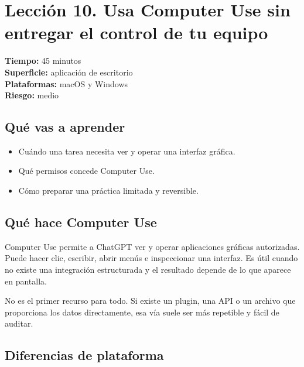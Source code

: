 \documentclass[10pt,a4paper,openany]{book}
\providecommand{\tightlist}{\setlength{\itemsep}{0.18em}\setlength{\parskip}{0pt}}
\begin{document}
\clearpage

\section{Lección 10. Usa Computer Use sin entregar el control de tu
equipo}\label{lecciuxf3n-10.-usa-computer-use-sin-entregar-el-control-de-tu-equipo}

\begin{metabox}

\textbf{Tiempo:} 45 minutos\\
\textbf{Superficie:} aplicación de escritorio\\
\textbf{Plataformas:} macOS y Windows\\
\textbf{Riesgo:} medio

\end{metabox}

\subsection{Qué vas a aprender}\label{quuxe9-vas-a-aprender-9}

\begin{itemize}
\tightlist
\item
  Cuándo una tarea necesita ver y operar una interfaz gráfica.
\item
  Qué permisos concede Computer Use.
\item
  Cómo preparar una práctica limitada y reversible.
\end{itemize}

\subsection{Qué hace Computer Use}\label{quuxe9-hace-computer-use}

Computer Use permite a ChatGPT ver y operar aplicaciones gráficas
autorizadas. Puede hacer clic, escribir, abrir menús e inspeccionar una
interfaz. Es útil cuando no existe una integración estructurada y el
resultado depende de lo que aparece en pantalla.

No es el primer recurso para todo. Si existe un plugin, una API o un
archivo que proporciona los datos directamente, esa vía suele ser más
repetible y fácil de auditar.

\subsection{Diferencias de plataforma}\label{diferencias-de-plataforma}
\end{document}
